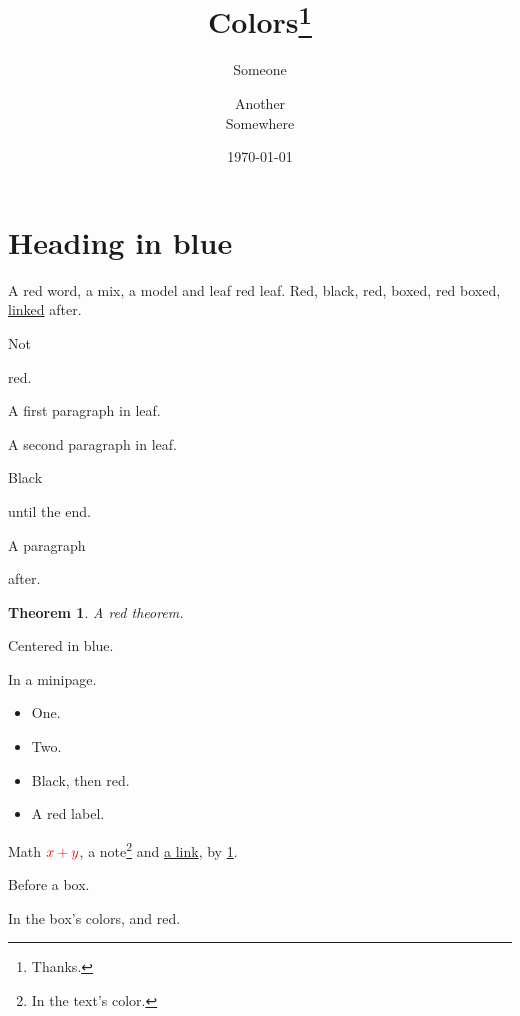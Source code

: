 \documentclass{article}
\title{{\color{blue} Colors}\thanks{Thanks.}}
\author{{\color{red} Someone} \and Another\\ Somewhere}
\date{\today}
\newtheorem{theorem}{Theorem}
\begin{document}
\maketitle
\section{Heading {\color{blue} in blue}}
A {\color{red} red} word, {\color{blue!50!black} a mix}, {\color[rgb]{0,0.5,0} a model}
and \textcolor{leaf}{leaf {\color{red} red} leaf}.
{\color{red} Red, {\color{black} black,} red}, \colorbox{yellow!30}{boxed},
\colorbox{yellow!30}{\color{red} red boxed}, \hyperlink{here}{\color{red} linked} after.

\hypertarget{here}{Not} red.

{\color{leaf} A first paragraph in leaf.

A second paragraph in leaf.}

Black {\color{red} until the end.

A paragraph} after.

\begin{theorem}\label{thm}\color{red} A red theorem.\end{theorem}

\begin{center}\color{blue} Centered in blue.\end{center}

\noindent\begin{minipage}{0.5\linewidth}\color{blue} In a minipage.\end{minipage}

{\color{red}\begin{itemize}\item One. \item Two.\end{itemize}}

\begin{itemize}\item Black, \color{red} then red. \item A red label.\end{itemize}

Math $\color{red} x + y$, {\color{red} a note\footnote{In the text's color.}}
and \href{https://example.com}{a link}, by \cref{thm}.

{\color{blue} Before a box.\par}
\begin{tcolorbox}[title=A box]In the box's colors, {\color{red} and red}.\end{tcolorbox}
\end{document}
